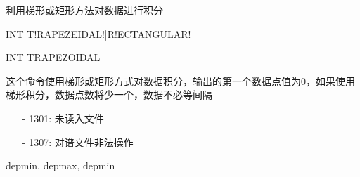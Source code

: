 \label{cmd:int}

利用梯形或矩形方法对数据进行积分

\begin{SACSTX}
INT T!RAPEZEIDAL!|R!ECTANGULAR!
\end{SACSTX}

\begin{SACDFT}
INT TRAPEZOIDAL
\end{SACDFT}

这个命令使用梯形或矩形方式对数据积分，输出的第一个数据点值为0，如果使用梯形积分，数据点数将少一个，数据不必等间隔

\begin{itemize}
\item[-]1301: 未读入文件
\item[-]1307: 对谱文件非法操作
\end{itemize}

depmin, depmax, depmin
